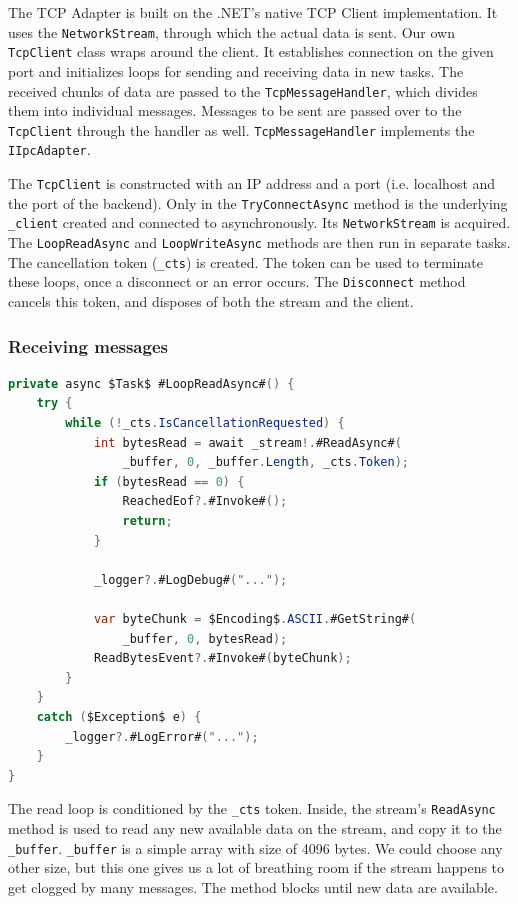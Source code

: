 The TCP Adapter is built on the .NET's native TCP Client implementation. It uses the \texttt{NetworkStream}, through which the actual data is sent. Our own \texttt{TcpClient} class wraps around the client. It establishes connection on the given port and initializes loops for sending and receiving data in new tasks. The received chunks of data are passed to the \texttt{TcpMessageHandler}, which divides them into individual messages. Messages to be sent are passed over to the \texttt{TcpClient} through the handler as well. \texttt{TcpMessageHandler} implements the \texttt{IIpcAdapter}.

The \texttt{TcpClient} is constructed with an IP address and a port (i.e. localhost and the port of the backend). Only in the \texttt{TryConnectAsync} method is the underlying \texttt{\_client} created and connected to asynchronously. Its \texttt{NetworkStream} is acquired. The \texttt{LoopReadAsync} and \texttt{LoopWriteAsync} methods are then run in separate tasks. The cancellation token (\texttt{\_cts}) is created. The token can be used to terminate these loops, once a disconnect or an error occurs. The \texttt{Disconnect} method cancels this token, and disposes of both the stream and the client.

\subsubsection{Receiving messages}

\begin{lstlisting}[language=csharp, caption={\texttt{TcpClient.LoopReadAsync} method}]
private async $Task$ #LoopReadAsync#() {
    try {
        while (!_cts.IsCancellationRequested) {
            int bytesRead = await _stream!.#ReadAsync#(
                _buffer, 0, _buffer.Length, _cts.Token);
            if (bytesRead == 0) {
                ReachedEof?.#Invoke#();
                return;
            }

            _logger?.#LogDebug#("...");

            var byteChunk = $Encoding$.ASCII.#GetString#(
                _buffer, 0, bytesRead);
            ReadBytesEvent?.#Invoke#(byteChunk);
        }
    }
    catch ($Exception$ e) {
        _logger?.#LogError#("...");
    }
}
\end{lstlisting}

The read loop is conditioned by the \texttt{\_cts} token. Inside, the stream's \texttt{ReadAsync} method is used to read any new available data on the stream, and copy it to the \texttt{\_buffer}. \texttt{\_buffer} is a simple array with size of 4096 bytes. We could choose any other size, but this one gives us a lot of breathing room if the stream happens to get clogged by many messages. The method blocks until new data are available.

